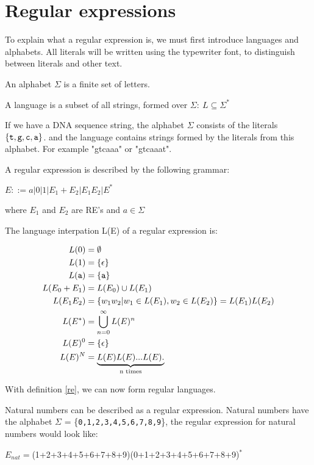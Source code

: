 \section{Regular expressions} 
  To explain what a regular expression is, we must first introduce languages and alphabets. All literals will be written using the typewriter font, to distinguish between literals and other text. 
\begin{mydef}\label{alph}
An alphabet $\Sigma$ is a finite set of letters.
\end{mydef}

\begin{mydef}\label{lang}
A language is a subset of all strings, formed over $\Sigma:~ L\subseteq \Sigma^*$
\end{mydef}

\begin{myex}
If we have a DNA sequence string, the alphabet $\Sigma$ consists of the literals ${\tt\{t,g,c,a\}}$. and the language contains strings formed by the literals from this alphabet. For example "gtcaaa" or "gtcaaat". 
\end{myex}


\begin{mydef}
A regular expression is described by the following grammar: \\
\begin{center}
$E::= a|0|1|E_1 + E_2 |E_1 E_2 | E^*$
\end{center}
where $E_1$ and $E_2$ are RE's and $a \in \Sigma$
\end{mydef}

\begin{mydef}\label{re}
The language interpation L(E) of a regular expression is: 
\begin{center}
\begin{align*}
L(0)           &= \emptyset\\
L(1)         &= \{\epsilon\} \\
L({\tt a})     &= \{{\tt a}\} \\
L(E_0 + E_1) &= L(E_0) \cup L(E_1) \\
L(E_1 E_2)   &= \{w_1w_2 | w_1 \in L(E_1),w_2 \in L(E_2)\}=L(E_1)L(E_2) \\
L(E^*)       &= \bigcup\limits_{n=0}^\infty L(E)^n \\
L(E)^0       &= \{\epsilon\}\\
L(E)^N       &= \underbrace{L(E)L(E)...L(E).}_\text{n times}
\end{align*}
\end{center}
\cite[p.5 def. 3]{crash}
\end{mydef}

With definition \ref{re}, we can now form regular languages. 
\begin{myex}Natural numbers can be described as a regular expression. Natural numbers have the alphabet $\Sigma$ = \{{\tt 0,1,2,3,4,5,6,7,8,9}\}, the regular expression for natural numbers would look like:
\begin{center}
$E_{nat} = $(1+2+3+4+5+6+7+8+9)(0+1+2+3+4+5+6+7+8+9)$^*$
\end{center}
\end{myex}